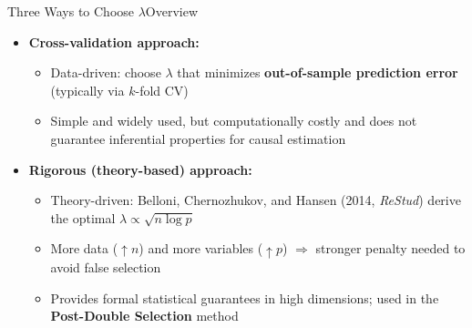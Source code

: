 \documentclass[dvipsnames,hyperref={pdfpagelabels=false}]{beamer}
\begin{document}
\begin{frame}{Three Ways to Choose $\lambda$}{Overview}
    \begin{itemize}
        \item[1] \textbf{Cross-validation approach:}
        \vspace{0.2cm}
        \begin{itemize}
            \item Data-driven: choose $\lambda$ that minimizes 
            \textbf{out-of-sample prediction error} (typically via $k$-fold CV)
            \vspace{0.2cm}
            \item Simple and widely used, but computationally costly 
            and does not guarantee inferential properties for causal estimation
        \end{itemize}
        \vspace{0.2cm}
        \item[2] \textbf{Rigorous (theory-based) approach:}
        \vspace{0.2cm}
        \begin{itemize}
            \item Theory-driven: Belloni, Chernozhukov, and Hansen 
            (2014, \textit{ReStud}) derive the optimal 
            $\lambda \propto \sqrt{n \log p}$
            \vspace{0.2cm}
            \item More data ($\uparrow n$) and more variables ($\uparrow p$) 
            $\Rightarrow$ stronger penalty needed to avoid false selection
            \vspace{0.2cm}
            \item Provides formal statistical guarantees in high dimensions; 
            used in the \textbf{Post-Double Selection} method
        \end{itemize}
    \end{itemize}
\end{frame}
\end{document}
